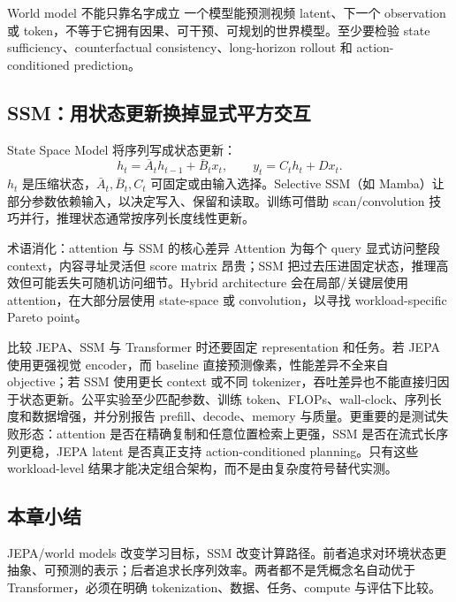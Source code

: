 
\begin{warningbox}{World model 不能只靠名字成立}
一个模型能预测视频 latent、下一个 observation 或 token，不等于它拥有因果、可干预、可规划的世界模型。至少要检验 state sufficiency、counterfactual consistency、long-horizon rollout 和 action-conditioned prediction。
\end{warningbox}

\subsection{SSM：用状态更新换掉显式平方交互}

State Space Model 将序列写成状态更新：
\[
h_t=\bar{A}_t h_{t-1}+\bar{B}_t x_t,
\qquad y_t=C_t h_t+D x_t.
\]
$h_t$ 是压缩状态，$\bar{A}_t,\bar{B}_t,C_t$ 可固定或由输入选择。Selective SSM（如 Mamba）让部分参数依赖输入，以决定写入、保留和读取。训练可借助 scan/convolution 技巧并行，推理状态通常按序列长度线性更新。




\begin{knowledgebox}{术语消化：attention 与 SSM 的核心差异}
Attention 为每个 query 显式访问整段 context，内容寻址灵活但 score matrix 昂贵；SSM 把过去压进固定状态，推理高效但可能丢失可随机访问细节。Hybrid architecture 会在局部/关键层使用 attention，在大部分层使用 state-space 或 convolution，以寻找 workload-specific Pareto point。
\end{knowledgebox}

比较 JEPA、SSM 与 Transformer 时还要固定 representation 和任务。若 JEPA 使用更强视觉 encoder，而 baseline 直接预测像素，性能差异不全来自 objective；若 SSM 使用更长 context 或不同 tokenizer，吞吐差异也不能直接归因于状态更新。公平实验至少匹配参数、训练 token、FLOPs、wall-clock、序列长度和数据增强，并分别报告 prefill、decode、memory 与质量。更重要的是测试失败形态：attention 是否在精确复制和任意位置检索上更强，SSM 是否在流式长序列更稳，JEPA latent 是否真正支持 action-conditioned planning。只有这些 workload-level 结果才能决定组合架构，而不是由复杂度符号替代实测。

\subsection{本章小结}

JEPA/world models 改变学习目标，SSM 改变计算路径。前者追求对环境状态更抽象、可预测的表示；后者追求长序列效率。两者都不是凭概念名自动优于 Transformer，必须在明确 tokenization、数据、任务、compute 与评估下比较。

